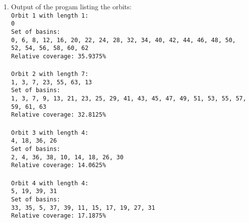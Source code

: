 \documentclass[10pt,a4paper]{article}
\begin{document}
\begin{enumerate}
\item Output of the progam listing the orbits:\\
\texttt{Orbit 1 with length 1:\\
0\\
Set of basins:\\
0, 6, 8, 12, 16, 20, 22, 24, 28, 32, 34, 40, 42, 44, 46, 48, 50, 52, 54, 56, 58, 60, 62\\
Relative coverage: 35.9375\%\\
\\
Orbit 2 with length 7:\\
1, 3, 7, 23, 55, 63, 13\\
Set of basins:\\
1, 3, 7, 9, 13, 21, 23, 25, 29, 41, 43, 45, 47, 49, 51, 53, 55, 57, 59, 61, 63\\
Relative coverage: 32.8125\%\\
\\
Orbit 3 with length 4:\\
4, 18, 36, 26\\
Set of basins:\\
2, 4, 36, 38, 10, 14, 18, 26, 30\\
Relative coverage: 14.0625\%\\
\\
Orbit 4 with length 4:\\
5, 19, 39, 31\\
Set of basins:\\
33, 35, 5, 37, 39, 11, 15, 17, 19, 27, 31\\
Relative coverage: 17.1875\%}


\end{enumerate}
\end{document}

